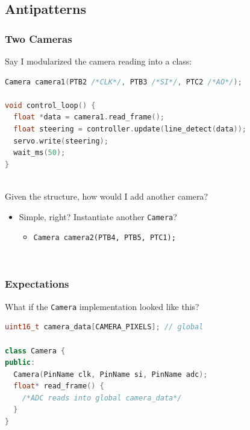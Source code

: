 \documentclass{beamer}
\begin{document}
\subsection{Antipatterns}
\begin{frame}[fragile]
\frametitle{Two Cameras}
Say I modularized the camera reading into a class:
\begin{lstlisting}[language=C++,basicstyle=\ttfamily\scriptsize]
Camera camera1(PTB2 /*CLK*/, PTB3 /*SI*/, PTC2 /*AO*/);

void control_loop() {
  float *data = camera1.read_frame();
  float steering = controller.update(line_detect(data));
  servo.write(steering);
  wait_ms(50);
}
\end{lstlisting}
\hfill \\
Given the structure, how would I add another camera?
\hfill \\
\begin{itemize}
  \item<2-> Simple, right? Instantiate another \texttt{Camera}?
  \begin{itemize}
    \item \texttt{Camera camera2(PTB4, PTB5, PTC1);}
  \end{itemize}
\end{itemize}
\hfill \\
\end{frame}

\begin{frame}[fragile]
\frametitle{Expectations}
What if the \texttt{Camera} implementation looked like this?
\hfill \\
\begin{lstlisting}[language=C++,basicstyle=\ttfamily\scriptsize]
uint16_t camera_data[CAMERA_PIXELS]; // global

class Camera {
public:
  Camera(PinName clk, PinName si, PinName adc);
  float* read_frame() {
    /*ADC reads into global camera_data*/
  }
}
\end{lstlisting}
\hfill \\
\end{frame}
\end{document}

